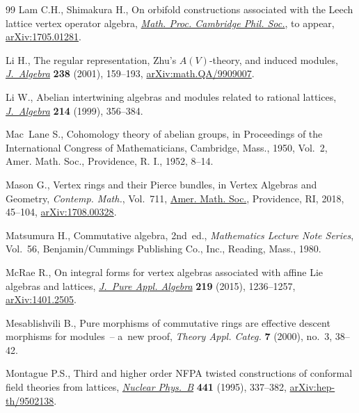 \documentclass[11pt]{article}
\theoremstyle{definition}
\begin{document}
\begin{thebibliography}{99}
Lam C.H., Shimakura H., On orbifold constructions associated with the Leech
 lattice vertex operator algebra, \href{https://doi.org/10.1017/S0305004118000658}{\textit{Math. Proc. Cambridge Phil. Soc.}},
 {t}o appear, \href{https://arxiv.org/abs/1705.01281}{arXiv:1705.01281}.

Li H., The regular representation, {Z}hu's {$A(V)$}-theory, and induced
 modules, \href{https://doi.org/10.1006/jabr.2000.8627}{\textit{J.~Algebra}} \textbf{238} (2001), 159--193,
 \href{https://arxiv.org/abs/math.QA/9909007}{arXiv:math.QA/9909007}.

Li W., Abelian intertwining algebras and modules related to rational lattices,
 \href{https://doi.org/10.1006/jabr.1998.7686}{\textit{J.~Algebra}} \textbf{214} (1999), 356--384.

Mac~Lane S., Cohomology theory of abelian groups, in Proceedings of the
 {I}nternational {C}ongress of {M}a\-the\-maticians, {C}ambridge, {M}ass., 1950,
 Vol.~2, Amer. Math. Soc., Providence, R. I., 1952, 8--14.

Mason G., Vertex rings and their {P}ierce bundles, in Vertex Algebras and
 Geometry, \textit{Contemp. Math.}, Vol.~711, \href{https://doi.org/10.1090/conm/711/14303}{Amer. Math. Soc.}, Providence,
 RI, 2018, 45--104, \href{https://arxiv.org/abs/1708.00328}{arXiv:1708.00328}.

Matsumura H., Commutative algebra, 2nd~ed., \textit{Mathematics Lecture Note Series},
 Vol.~56, Benjamin/Cummings Publishing Co., Inc., Reading, Mass.,
 1980.

McRae R., On integral forms for vertex algebras associated with affine {L}ie
 algebras and lattices, \href{https://doi.org/10.1016/j.jpaa.2014.06.003}{\textit{J.~Pure Appl. Algebra}} \textbf{219} (2015),
 1236--1257, \href{https://arxiv.org/abs/1401.2505}{arXiv:1401.2505}.

Mesablishvili B., Pure morphisms of commutative rings are effective descent
 morphisms for modules~-- a~new proof, \textit{Theory Appl. Categ.} \textbf{7}
 (2000), no.~3, 38--42.

Montague P.S., Third and higher order {NFPA} twisted constructions of conformal
 field theories from lattices, \href{https://doi.org/10.1016/0550-3213(95)00115-9}{\textit{Nuclear Phys.~B}} \textbf{441} (1995),
 337--382, \href{https://arxiv.org/abs/hep-th/9502138}{arXiv:hep-th/9502138}.


\end{thebibliography}
\end{document}
